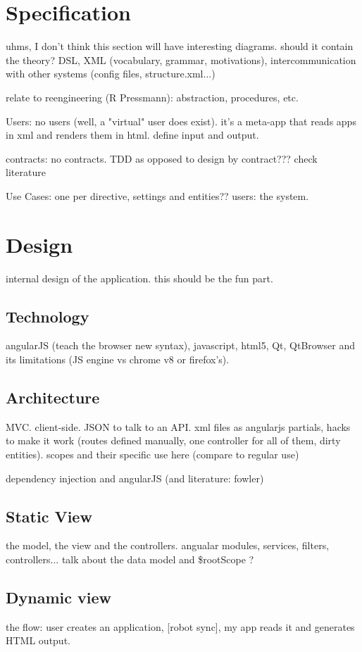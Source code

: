 \chapter{Specification}
uhms, I don't think this section will have interesting diagrams.
should it contain the theory? DSL, XML (vocabulary, grammar, motivations), intercommunication with other systems (config files, structure.xml...)

relate to reengineering (R Pressmann): abstraction, procedures, etc.

Users: no users (well, a "virtual" user does exist). it's a meta-app that reads apps in xml and renders them in html. define input and output.

contracts: no contracts. TDD as opposed to design by contract??? check literature

Use Cases: one per directive, settings and entities?? users: the system.

\chapter{Design}
internal design of the application. this should be the fun part.
\section{Technology}
angularJS (teach the browser new syntax), javascript, html5, Qt, QtBrowser and its limitations (JS engine vs chrome v8 or firefox's).

\section{Architecture}
MVC. client-side. JSON to talk to an API. xml files as angularjs partials, hacks to make it work (routes defined manually, one controller for all of them, dirty entities). scopes and their specific use here (compare to regular use)

dependency injection and angularJS (and literature: fowler)

\section{Static View}
the model, the view and the controllers. angualar modules, services, filters, controllers...
talk about the data model and \$rootScope ?

\section{Dynamic view}
the flow: user creates an application, [robot sync], my app reads it and generates HTML output.

